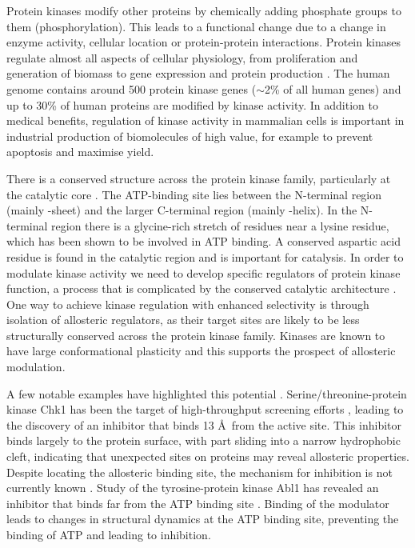 Protein kinases modify other proteins by chemically adding phosphate groups to them (phosphorylation).
This leads to a functional change due to a change in enzyme activity, cellular location or protein-protein interactions.
Protein kinases regulate almost all aspects of cellular physiology, from proliferation and generation of biomass to gene expression and protein production \cite{Manning2002}.
The human genome contains around 500 protein kinase genes ($\sim$2\% of all human genes) and up to 30\% of human proteins are modified by kinase activity.
In addition to medical benefits, regulation of kinase activity in mammalian cells is important in industrial production of biomolecules of high value, for example to prevent apoptosis and maximise yield.

There is a conserved structure across the protein kinase family, particularly at the catalytic core \cite{Endicott2012}.
The ATP-binding site lies between the N-terminal region (mainly \textbeta -sheet) and the larger C-terminal region (mainly \textalpha -helix).
In the N-terminal region there is a glycine-rich stretch of residues near a lysine residue, which has been shown to be involved in ATP binding.
A conserved aspartic acid residue is found in the catalytic region and is important for catalysis.
In order to modulate kinase activity we need to develop specific regulators of protein kinase function, a process that is complicated by the conserved catalytic architecture \cite{Muller2015, Norman2012}.
One way to achieve kinase regulation with enhanced selectivity is through isolation of allosteric regulators, as their target sites are likely to be less structurally conserved across the protein kinase family.
Kinases are known to have large conformational plasticity \cite{Kornev2015, Huse2002} and this supports the prospect of allosteric modulation.

A few notable examples have highlighted this potential \cite{DeSmet2014, Gavrin2013}.
Serine/threonine-protein kinase Chk1 has been the target of high-throughput screening efforts \cite{Converso2009}, leading to the discovery of an inhibitor that binds 13 \AA\ from the active site.
This inhibitor binds largely to the protein surface, with part sliding into a narrow hydrophobic cleft, indicating that unexpected sites on proteins may reveal allosteric properties.
Despite locating the allosteric binding site, the mechanism for inhibition is not currently known \cite{Vanderpool2009}.
Study of the tyrosine-protein kinase Abl1 has revealed an inhibitor that binds far from the ATP binding site \cite{Zhang2010, Yang2011}.
Binding of the modulator leads to changes in structural dynamics at the ATP binding site, preventing the binding of ATP and leading to inhibition.

